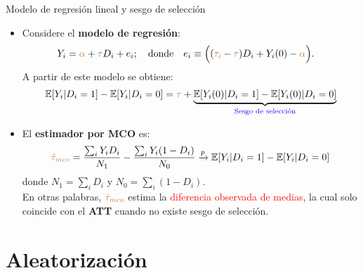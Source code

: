 \documentclass[10pt, xcolor=dvipsnames]{beamer}
\begin{document}
\begin{frame}{Modelo de regresión lineal y sesgo de selección}
\begin{itemize}
    \item Considere el \textbf{modelo de regresión}:
    \vspace{-0.5em}
    \begin{align*}
    \begin{split}
        Y_i &= \textcolor{brown}{\alpha} + \textcolor{brown}{\tau} D_i + e_i; \quad \text{donde} \quad e_i \equiv \Big((\textcolor{brown}{\tau_i} - \textcolor{brown}{\tau}) D_i + Y_i(0) - \textcolor{brown}{\alpha} \Big).
    \end{split}
    \end{align*}
    A partir de este modelo se obtiene:
    \begin{align*}
        \operatorname{\mathbb{E}}[Y_i | D_i=1] - \operatorname{\mathbb{E}}[Y_i | D_i=0] = \textcolor{brown}{\tau} +  \underbrace{\operatorname{\mathbb{E}}[Y_i(0) | D_i=1] - \operatorname{\mathbb{E}}[Y_i(0) | D_i=0]}_{\textcolor{blue}{\text{Sesgo de selección}}}
    \end{align*}
    \vspace{-0.8em}
    \item El \textbf{estimador por MCO} es:
    \begin{align*}
        \textcolor{brown}{\hat{\tau}_{mco}} = \frac{\sum_i Y_i D_i}{N_1} - \frac{\sum_i Y_i (1-D_i)}{N_0} \xrightarrow{p} \operatorname{\mathbb{E}}[Y_i | D_i=1] - \operatorname{\mathbb{E}}[Y_i | D_i=0]        
    \end{align*}
    donde \(N_1 = \sum_i D_i\) y \(N_0 = \sum_i (1-D_i)\). \\
    \vspace{1.0em}
    En otras palabras, \(\textcolor{brown}{\hat{\tau}_{mco}}\) estima la \textcolor{red}{diferencia observada de medias}, la cual solo coincide con el \textbf{ATT} cuando no existe sesgo de selección.
\end{itemize}
\end{frame}


\section{Aleatorización}
\end{document}
